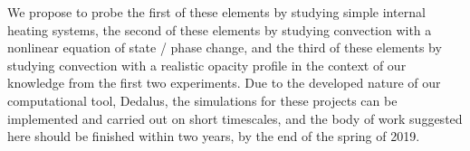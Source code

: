 \documentclass[aasms,12pt]{article}
\begin{document}
We propose to probe the first of these elements by studying simple internal heating systems,
the second of these elements by studying convection with a nonlinear equation of state / phase
change, and the third of these elements by studying convection with a realistic opacity profile
in the context of our knowledge from the first two experiments.  Due to the developed nature of
our computational tool, Dedalus, the simulations for these projects can be implemented and
carried out on short timescales, and the body of work suggested here should be finished within
two years, by the end of the spring of 2019.


\newpage


\end{document}
